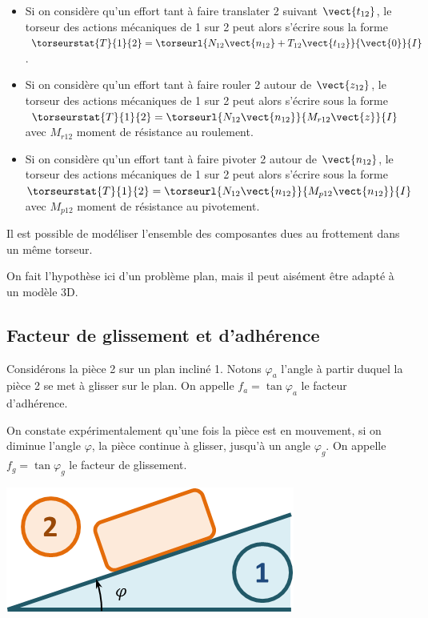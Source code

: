 \documentclass[10pt,fleqn]{article} %
\begin{document}
\begin{itemize}
\item Si on considère qu'un effort tant à faire translater 2 suivant $\vect{t_{12}}$, le torseur des actions mécaniques de 1 sur 2 peut alors s'écrire sous la forme $\torseurstat{T}{1}{2}=\torseurl{N_{12} \vect{n_{12}}+T_{12} \vect{t_{12}}}{\vect{0}}{I}$.
\item Si on considère qu'un effort tant à faire rouler 2 autour de $\vect{z_{12}}$, le torseur des actions mécaniques de 1 sur 2 peut alors s'écrire sous la forme $\torseurstat{T}{1}{2}=\torseurl{N_{12} \vect{n_{12}}}{M_{r12} \vect{z}}{I}$ avec $M_{r12}$ moment de résistance au roulement.
\item Si on considère qu'un effort tant à faire pivoter 2 autour de $\vect{n_{12}}$, le torseur des actions mécaniques de 1 sur 2 peut alors s'écrire sous la forme $\torseurstat{T}{1}{2}=\torseurl{N_{12} \vect{n_{12}}}{M_{p12} \vect{n_{12}}}{I}$ avec $M_{p12}$ moment de résistance au pivotement.
\end{itemize}

\begin{rem}
Il est possible de modéliser l'ensemble des composantes dues au frottement dans un même torseur. 

On fait l'hypothèse ici d'un problème plan, mais il peut aisément être adapté à un modèle 3D. 
\end{rem}

\subsection{Facteur de glissement et d'adhérence}
\noindent\begin{minipage}[c]{.7\linewidth}
Considérons la pièce 2 sur un plan incliné 1. Notons $\varphi_a$ l'angle à partir duquel la pièce 2 se met à glisser sur le plan. On appelle  $f_a=\tan\varphi_a$ le facteur d'adhérence.

On constate expérimentalement qu'une fois la pièce est en mouvement, si on diminue l'angle $\varphi$, la pièce continue à glisser, jusqu'à un angle  $\varphi_g$. On appelle \textbf{$f_g=\tan\varphi_g$} le facteur de glissement.
\end{minipage}\hfill
\begin{minipage}[c]{.25\linewidth}
\begin{center}
\includegraphics[width=\linewidth]{images/fig_02}
\end{center}
\end{minipage}
\end{document}
